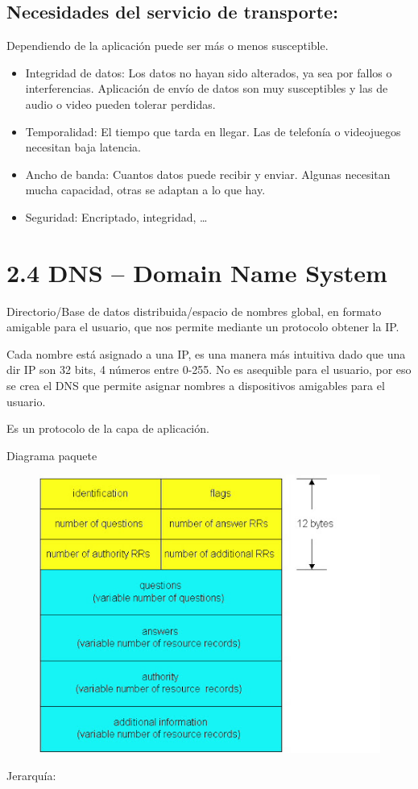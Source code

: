 \documentclass[12pt, twoside, openright]{report} %
\begin{document}
	
\subsection{Necesidades del servicio de transporte:}

  Dependiendo de la aplicación puede ser más o menos susceptible.

  \begin{itemize}
  \item
    Integridad de datos: Los datos no hayan sido alterados, ya sea por
    fallos o interferencias. Aplicación de envío de datos son muy
    susceptibles y las de audio o video pueden tolerar perdidas.
  \item
    Temporalidad: El tiempo que tarda en llegar. Las de telefonía o
    videojuegos necesitan baja latencia.
  \item
    Ancho de banda: Cuantos datos puede recibir y enviar. Algunas
    necesitan mucha capacidad, otras se adaptan a lo que hay.
  \item
    Seguridad: Encriptado, integridad, \ldots{}
  \end{itemize}

\section{2.4 DNS -- Domain Name System}

    Directorio/Base de datos distribuida/espacio de nombres global, en
    formato amigable para el usuario, que nos permite mediante un
    protocolo obtener la IP.

	Cada nombre está asignado a una IP, es una manera más intuitiva
    dado que una dir IP son 32 bits, 4 números entre 0-255. No es
    asequible para el usuario, por eso se crea el DNS que permite
    asignar nombres a dispositivos amigables para el usuario.

	Es un protocolo de la capa de aplicación.

	Diagrama paquete
	\begin{figure}[H]
		{\includegraphics[scale=.4]{Untitled.jpeg}}
	\end{figure}
	Jerarquía:
\end{document}
